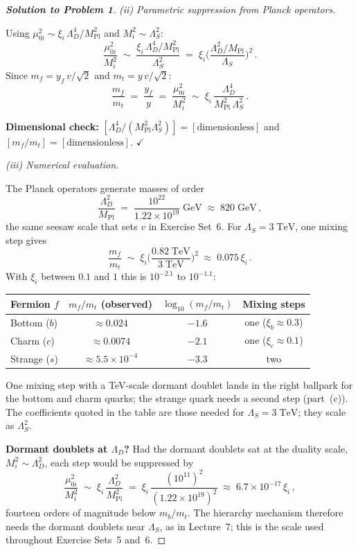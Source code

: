 \documentclass[11pt,a4paper]{article}
\begin{document}
\begin{proof}[\textbf{Solution to Problem 1}]
\textit{(ii) Parametric suppression from Planck operators.}

Using $\mu_{0i}^2 \sim \xi_i\, \Lambda_D^4/M_{\text{Pl}}^2$ and
$M_i^2 \sim \Lambda_S^2$:
\[
  \frac{\mu_{0i}^2}{M_i^2}
  \;\sim\; \frac{\xi_i\, \Lambda_D^4 / M_{\text{Pl}}^2}{\Lambda_S^2}
  \;=\; \xi_i \biggl(\frac{\Lambda_D^2/M_{\text{Pl}}}{\Lambda_S}\biggr)^{\!2}\,.
\]
Since $m_f = y_f\, v/\sqrt{2}$ and $m_t = y\, v/\sqrt{2}$:
\[
  \boxed{\frac{m_f}{m_t}
  \;=\; \frac{y_f}{y}
  \;=\; \frac{\mu_{0i}^2}{M_i^2}
  \;\sim\; \xi_i\, \frac{\Lambda_D^4}{M_{\text{Pl}}^2\,\Lambda_S^2}\,.}
\]

\textbf{Dimensional check:}
$[\Lambda_D^4/(M_{\text{Pl}}^2\Lambda_S^2)] = [\text{dimensionless}]$ and
$[m_f/m_t] = [\text{dimensionless}]$.
\quad$\checkmark$

\textit{(iii) Numerical evaluation.}

The Planck operators generate masses of order
\[
  \frac{\Lambda_D^2}{M_{\text{Pl}}}
  \;=\; \frac{10^{22}}{1.22 \times 10^{19}}\;\text{GeV}
  \;\approx\; 820\;\text{GeV}\,,
\]
the same seesaw scale that sets $v$ in Exercise Set~6.  For
$\Lambda_S = 3\;\text{TeV}$, one mixing step gives
\[
  \frac{m_f}{m_t}
  \;\sim\; \xi_i \biggl(\frac{0.82\;\text{TeV}}{3\;\text{TeV}}\biggr)^{\!2}
  \;\approx\; 0.075\,\xi_i\,.
\]
With $\xi_i$ between $0.1$ and $1$ this is $10^{-2.1}$ to $10^{-1.1}$:

\renewcommand{\arraystretch}{1.3}
\begin{center}
\begin{tabular}{@{} l c c c @{}}
\toprule
\textbf{Fermion $f$} & $m_f / m_t$ (observed) & $\log_{10}(m_f/m_t)$
  & \textbf{Mixing steps} \\
\midrule
Bottom ($b$) & $\approx 0.024$ & $-1.6$ & one ($\xi_b \approx 0.3$) \\
Charm ($c$) & $\approx 0.0074$ & $-2.1$ & one ($\xi_c \approx 0.1$) \\
Strange ($s$) & $\approx 5.5 \times 10^{-4}$ & $-3.3$ & two \\
\bottomrule
\end{tabular}
\end{center}

One mixing step with a TeV-scale dormant doublet lands in the right
ballpark for the bottom and charm quarks; the strange quark needs a
second step (part~(c)).  The coefficients quoted in the table are
those needed for $\Lambda_S = 3\;\text{TeV}$; they scale as
$\Lambda_S^2$.

\textbf{Dormant doublets at $\Lambda_D$?}
Had the dormant doublets sat at the duality scale,
$M_i^2 \sim \Lambda_D^2$, each step would be suppressed by
\[
  \frac{\mu_{0i}^2}{M_i^2}
  \;\sim\; \xi_i\,\frac{\Lambda_D^2}{M_{\text{Pl}}^2}
  \;=\; \xi_i\,\frac{(10^{11})^2}{(1.22 \times 10^{19})^2}
  \;\approx\; 6.7 \times 10^{-17}\,\xi_i\,,
\]
fourteen orders of magnitude below $m_b/m_t$.  The hierarchy
mechanism therefore needs the dormant doublets near $\Lambda_S$, as
in Lecture~7; this is the scale used throughout Exercise Sets~5
and~6.


\end{proof}
\end{document}

